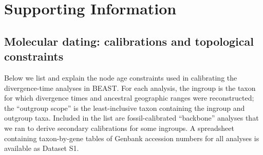 \section*{Supporting Information}

\subsection*{Molecular dating: calibrations and topological constraints}






Below we list and explain the node age constraints used in calibrating
the divergence-time analyses in BEAST. For each analysis, the ingroup
is the taxon for which divergence times and ancestral geographic
ranges were reconstructed; the ``outgroup scope'' is the
least-inclusive taxon containing the ingroup and outgroup
taxa. Included in the list are fossil-calibrated ``backbone'' analyses
that we ran to derive secondary calibrations for some ingroups. A
spreadsheet containing taxon-by-gene tables of Genbank accession
numbers for all analyses is available as Dataset S1.


